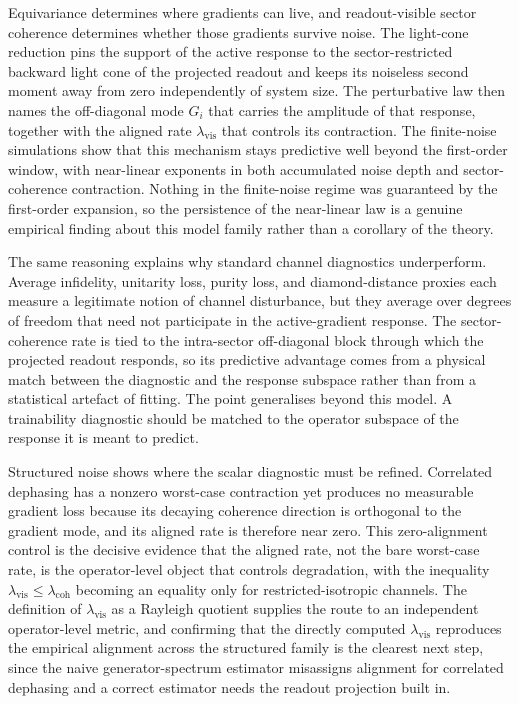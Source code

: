 \documentclass{article}
\newcommand{\lcoh}{\lambda_{\mathrm{coh}}}
\newcommand{\lvis}{\lambda_{\mathrm{vis}}}
\begin{document}
Equivariance determines where gradients can live, and readout-visible sector coherence determines whether those gradients survive noise. The light-cone reduction pins the support of the active response to the sector-restricted backward light cone of the projected readout and keeps its noiseless second moment away from zero independently of system size. The perturbative law then names the off-diagonal mode $G_i$ that carries the amplitude of that response, together with the aligned rate $\lvis$ that controls its contraction. The finite-noise simulations show that this mechanism stays predictive well beyond the first-order window, with near-linear exponents in both accumulated noise depth and sector-coherence contraction. Nothing in the finite-noise regime was guaranteed by the first-order expansion, so the persistence of the near-linear law is a genuine empirical finding about this model family rather than a corollary of the theory.

The same reasoning explains why standard channel diagnostics underperform. Average infidelity, unitarity loss, purity loss, and diamond-distance proxies each measure a legitimate notion of channel disturbance, but they average over degrees of freedom that need not participate in the active-gradient response. The sector-coherence rate is tied to the intra-sector off-diagonal block through which the projected readout responds, so its predictive advantage comes from a physical match between the diagnostic and the response subspace rather than from a statistical artefact of fitting. The point generalises beyond this model. A trainability diagnostic should be matched to the operator subspace of the response it is meant to predict.

Structured noise shows where the scalar diagnostic must be refined. Correlated dephasing has a nonzero worst-case contraction yet produces no measurable gradient loss because its decaying coherence direction is orthogonal to the gradient mode, and its aligned rate is therefore near zero. This zero-alignment control is the decisive evidence that the aligned rate, not the bare worst-case rate, is the operator-level object that controls degradation, with the inequality $\lvis\leq\lcoh$ becoming an equality only for restricted-isotropic channels. The definition of $\lvis$ as a Rayleigh quotient supplies the route to an independent operator-level metric, and confirming that the directly computed $\lvis$ reproduces the empirical alignment across the structured family is the clearest next step, since the naive generator-spectrum estimator misassigns alignment for correlated dephasing and a correct estimator needs the readout projection built in.
\end{document}
